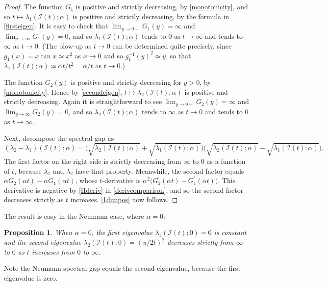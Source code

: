 \documentclass[12pt,reqno]{amsart}
\newtheorem{proposition}[proposition]{Proposition}
\theoremstyle{definition}
\newcommand{\go}{G_1}
\newcommand{\gt}{G_2}
\begin{document}
\begin{proof}
The function $\go$ is positive and strictly decreasing, by \autoref{monotonicity}, and so $t \mapsto \lambda_1(\mathcal{I}(t);\alpha)$ is positive and strictly decreasing, by the formula in \autoref{firsteigen}. It is easy to check that $\lim_{y \to 0+} \go(y)=\infty$ and $\lim_{y \to \infty} \go(y)=0$, and so $\lambda_1(\mathcal{I}(t);\alpha)$ tends to $0$ as $t \to \infty$ and tends to $\infty$ as $t \to 0$. (The blow-up as $t \to 0$ can be determined quite precisely, since $g_1(x) = x \tan x \simeq x^2$ as $x \to 0$ and so $g_1^{-1}(y)^2 \simeq y$, so that $\lambda_1(\mathcal{I}(t);\alpha) \simeq \alpha t /t^2=\alpha/t$ as $t \to 0$.)

The function $\gt(y)$ is positive and strictly decreasing for $y>0$, by \autoref{monotonicity}. Hence by \autoref{secondeigen}, $t \mapsto \lambda_2(\mathcal{I}(t);\alpha)$ is positive and strictly decreasing. Again it is straightforward to see $\lim_{y \to 0+} \gt(y)=\infty$ and $\lim_{y \to \infty} \gt(y)=0$, and so $\lambda_2(\mathcal{I}(t);\alpha)$ tends to $\infty$ as $t \to 0$ and tends to $0$ as $t \to \infty$.  

Next, decompose the spectral gap as 
\[
(\lambda_2-\lambda_1)(\mathcal{I}(t);\alpha) 
= \big( \sqrt{\lambda_2(\mathcal{I}(t);\alpha)}+\sqrt{\lambda_1(\mathcal{I}(t);\alpha)} \big) \big( \sqrt{\lambda_2(\mathcal{I}(t);\alpha)}-\sqrt{\lambda_1(\mathcal{I}(t);\alpha)} \big) .
\]
The first factor on the right side is strictly decreasing from $\infty$ to $0$ as a function of $t$, because $\lambda_1$ and $\lambda_2$ have that property. Meanwhile, the second factor equals $\alpha \gt(\alpha t) - \alpha \go(\alpha t)$, whose $t$-derivative is $\alpha^2 \big( \gt^\prime(\alpha t) - \go^\prime(\alpha t) \big)$. This derivative is negative by \eqref{Hderiv} in \autoref{derivcomparison}, and so the second factor decreases strictly as $t$ increases. \autoref{1dimpos} now follows. 
\end{proof}

The result is easy in the Neumann case, where $\alpha=0$:
%
\begin{proposition}\label{1dimzero}
When $\alpha=0$, the first eigenvalue $\lambda_1(\mathcal{I}(t);0)=0$ is constant and the second eigenvalue $\lambda_2(\mathcal{I}(t);0)=(\pi/2t)^2$ decreases strictly from $\infty$ to $0$ as $t$ increases from $0$ to $\infty$. 
\end{proposition}
%
Note the Neumann spectral gap equals the second eigenvalue, because the first eigenvalue is zero. 
\end{document}
